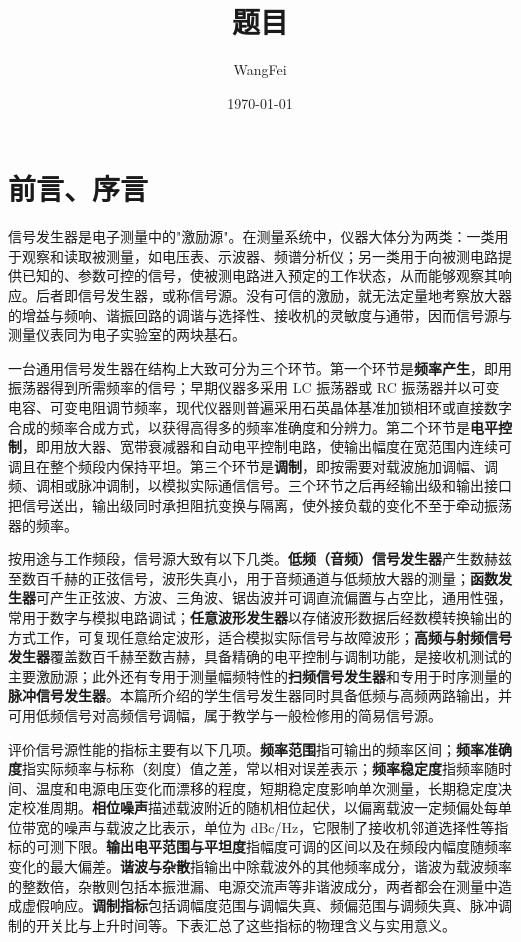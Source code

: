 \documentclass[12pt,UTF8]{ctexbook}
\title{\heiti\zihao{0} 题目}
\author{WangFei}
\date{\today}
\begin{document}
\maketitle
\tableofcontents

\frontmatter
\chapter{前言、序言}

信号发生器是电子测量中的"激励源"。在测量系统中，仪器大体分为两类：一类用于观察和读取被测量，如电压表、示波器、频谱分析仪；另一类用于向被测电路提供已知的、参数可控的信号，使被测电路进入预定的工作状态，从而能够观察其响应。后者即信号发生器，或称信号源。没有可信的激励，就无法定量地考察放大器的增益与频响、谐振回路的调谐与选择性、接收机的灵敏度与通带，因而信号源与测量仪表同为电子实验室的两块基石。

一台通用信号发生器在结构上大致可分为三个环节。第一个环节是\textbf{频率产生}，即用振荡器得到所需频率的信号；早期仪器多采用 LC 振荡器或 RC 振荡器并以可变电容、可变电阻调节频率，现代仪器则普遍采用石英晶体基准加锁相环或直接数字合成的频率合成方式，以获得高得多的频率准确度和分辨力。第二个环节是\textbf{电平控制}，即用放大器、宽带衰减器和自动电平控制电路，使输出幅度在宽范围内连续可调且在整个频段内保持平坦。第三个环节是\textbf{调制}，即按需要对载波施加调幅、调频、调相或脉冲调制，以模拟实际通信信号。三个环节之后再经输出级和输出接口把信号送出，输出级同时承担阻抗变换与隔离，使外接负载的变化不至于牵动振荡器的频率。

按用途与工作频段，信号源大致有以下几类。\textbf{低频（音频）信号发生器}产生数赫兹至数百千赫的正弦信号，波形失真小，用于音频通道与低频放大器的测量；\textbf{函数发生器}可产生正弦波、方波、三角波、锯齿波并可调直流偏置与占空比，通用性强，常用于数字与模拟电路调试；\textbf{任意波形发生器}以存储波形数据后经数模转换输出的方式工作，可复现任意给定波形，适合模拟实际信号与故障波形；\textbf{高频与射频信号发生器}覆盖数百千赫至数吉赫，具备精确的电平控制与调制功能，是接收机测试的主要激励源；此外还有专用于测量幅频特性的\textbf{扫频信号发生器}和专用于时序测量的\textbf{脉冲信号发生器}。本篇所介绍的学生信号发生器同时具备低频与高频两路输出，并可用低频信号对高频信号调幅，属于教学与一般检修用的简易信号源。

评价信号源性能的指标主要有以下几项。\textbf{频率范围}指可输出的频率区间；\textbf{频率准确度}指实际频率与标称（刻度）值之差，常以相对误差表示；\textbf{频率稳定度}指频率随时间、温度和电源电压变化而漂移的程度，短期稳定度影响单次测量，长期稳定度决定校准周期。\textbf{相位噪声}描述载波附近的随机相位起伏，以偏离载波一定频偏处每单位带宽的噪声与载波之比表示，单位为 dBc/Hz，它限制了接收机邻道选择性等指标的可测下限。\textbf{输出电平范围与平坦度}指幅度可调的区间以及在频段内幅度随频率变化的最大偏差。\textbf{谐波与杂散}指输出中除载波外的其他频率成分，谐波为载波频率的整数倍，杂散则包括本振泄漏、电源交流声等非谐波成分，两者都会在测量中造成虚假响应。\textbf{调制指标}包括调幅度范围与调幅失真、频偏范围与调频失真、脉冲调制的开关比与上升时间等。下表汇总了这些指标的物理含义与实用意义。
\end{document}
